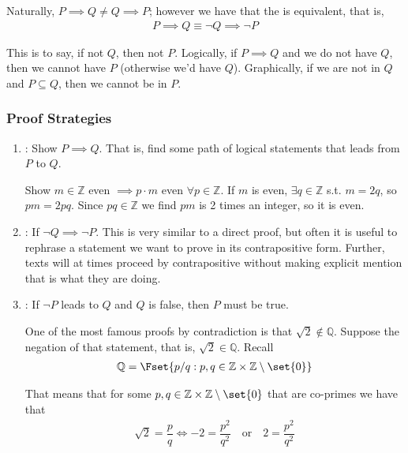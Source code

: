 \documentclass{article}
\begin{document}
Naturally, $P \implies Q \ne Q \implies P$; however we have that the  is equivalent, that is,
\begin{align*}
  P \implies Q \equiv \neg Q \implies \neg P
\end{align*}

This is to say, if not $Q$, then not $P$. Logically, if $P \implies Q$ and we do not have $Q$, then we cannot have $P$ (otherwise we'd have $Q$). Graphically, if we are not in $Q$ and $P \subseteq Q$, then we cannot be in $P$.

\subsubsection{Proof Strategies}
\label{ssub:proof_strategies}

\begin{enumerate}
  \item {}: Show $P \implies Q$. That is, find some path of logical statements that leads from $P$ to $Q$.
    \begin{example}
      Show $m \in \mathbb{Z}$ even $\implies p \cdot m$ even $\forall p \in \mathbb{Z}$. If $m$ is even, $\exists q \in \mathbb{Z}$ s.t. $m = 2q$, so $pm = 2pq$. Since $pq \in \mathbb{Z}$ we find $pm$ is 2 times an integer, so it is even.
    \end{example}

  \item {}: If $\neg Q \implies \neg P$. This is very similar to a direct proof, but often it is useful to rephrase a statement we want to prove in its contrapositive form. Further, texts will at times proceed by contrapositive without making explicit mention that is what they are doing.

  \item {}: If $\neg P$ leads to $Q$ and $Q$ is false, then $P$ must be true.
    \begin{example}
      One of the most famous proofs by contradiction is that $\sqrt{2} \notin \mathbb{Q}$. Suppose the negation of that statement, that is, $\sqrt{2} \in \mathbb{Q}$. Recall
      \begin{align*}
        \mathbb{Q} = \Fset{p / q: p, q \in \mathbb{Z} \times \mathbb{Z}\setminus\set{0}}
      \end{align*}

      That means that for some $p, q \in \mathbb{Z} \times \mathbb{Z}\setminus\set{0}$ that are co-primes we have that
      \begin{align*}
        \sqrt{2} = \dfrac{p}{q}
        \iff
        -2 = \dfrac{p^2}{q^2}
        \quad
        \text{or}
        \quad
        2 = \dfrac{p^2}{q^2}
      \end{align*}


\end{example}
\end{enumerate}
\end{document}
